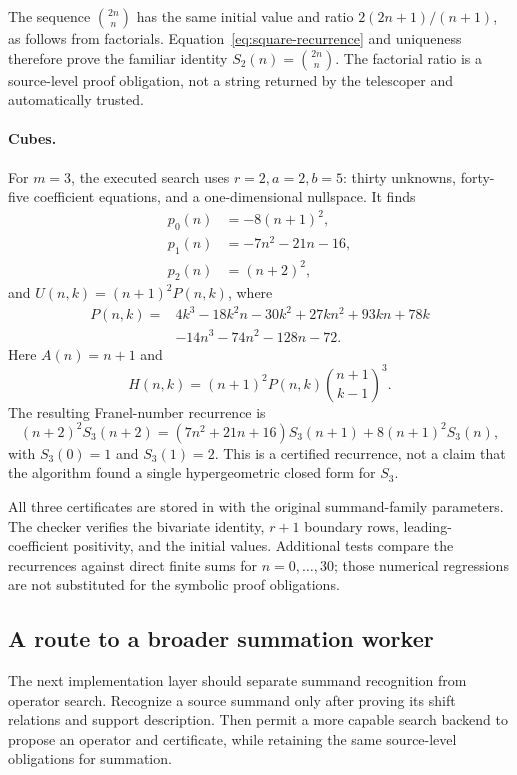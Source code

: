 The sequence $\binom{2n}{n}$ has the same initial value and ratio
$2(2n+1)/(n+1)$, as follows from factorials. Equation~\eqref{eq:square-recurrence}
and uniqueness therefore prove the familiar identity
$S_2(n)=\binom{2n}{n}$. The factorial ratio is a source-level proof obligation,
not a string returned by the telescoper and automatically trusted.

\paragraph{Cubes.}
For $m=3$, the executed search uses $r=2,a=2,b=5$: thirty unknowns, forty-five
coefficient equations, and a one-dimensional nullspace. It finds
\begin{align*}
 p_0(n)&=-8(n+1)^2,\\
 p_1(n)&=-7n^2-21n-16,\\
 p_2(n)&=(n+2)^2,
\end{align*}
and $U(n,k)=(n+1)^2P(n,k)$, where
\begin{align*}
 P(n,k)={}&4k^3-18k^2n-30k^2+27kn^2+93kn+78k\\
          &-14n^3-74n^2-128n-72.
\end{align*}
Here $A(n)=n+1$ and
\[
 H(n,k)=(n+1)^2P(n,k)\binom{n+1}{k-1}^{3}.
\]
The resulting Franel-number recurrence is
\begin{equation}
 (n+2)^2S_3(n+2)
 =(7n^2+21n+16)S_3(n+1)+8(n+1)^2S_3(n),
 \label{eq:franel}
\end{equation}
with $S_3(0)=1$ and $S_3(1)=2$. This is a certified recurrence, not a claim that
the algorithm found a single hypergeometric closed form for $S_3$.

All three certificates are stored in  with the
original summand-family parameters. The checker verifies the bivariate
identity, $r+1$ boundary rows, leading-coefficient positivity, and the initial
values. Additional tests compare the recurrences against direct finite sums
for $n=0,\ldots,30$; those numerical regressions are not substituted for the
symbolic proof obligations.

\subsection{A route to a broader summation worker}

The next implementation layer should separate summand recognition from
operator search. Recognize a source summand only after proving its shift
relations and support description. Then permit a more capable search backend
to propose an operator and certificate, while retaining the same source-level
obligations for summation.

